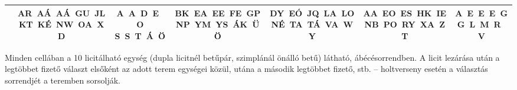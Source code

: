 \documentclass[11pt]{extarticle}
\begin{document}
\begin{center}
\begin{tabular}{|lcccccc|}
\textbf{\rule{0pt}{3.4ex}5. terem\rule[-1.4ex]{0pt}{0pt}} & \shortstack{\rule{0pt}{3.4ex}AR~AÁ~AÁ~GU~JL \\ KT~KÉ~NW~OA~XD\rule[-1.4ex]{0pt}{0pt}} & \shortstack{\rule{0pt}{3.4ex}A~A~D~E~O \\ S~S~T~Á~Ö\rule[-1.4ex]{0pt}{0pt}} & \shortstack{\rule{0pt}{3.4ex}BK~EA~EE~FE~GP \\ NP~YM~YS~ÁK~ÜÖ\rule[-1.4ex]{0pt}{0pt}} & \shortstack{\rule{0pt}{3.4ex}DY~EÓ~JQ~LA~LO \\ NÉ~TA~TÁ~VA~WY\rule[-1.4ex]{0pt}{0pt}} & \shortstack{\rule{0pt}{3.4ex}AA~EO~ES~HK~IE \\ NB~PO~RY~XA~ZT\rule[-1.4ex]{0pt}{0pt}} & \shortstack{\rule{0pt}{3.4ex}A~E~E~E~G \\ G~L~M~R~V\rule[-1.4ex]{0pt}{0pt}} \\ \hline
\end{tabular}
\end{center}

\vspace{6pt}
{\footnotesize Minden cellában a 10 licitálható egység (dupla licitnél betűpár, szimplánál
önálló betű) látható, ábécésorrendben. A licit lezárása után a legtöbbet fizető választ
elsőként az adott terem egységei közül, utána a második legtöbbet fizető, stb. -- holtverseny
esetén a választás sorrendjét a teremben sorsolják.}
\end{document}
